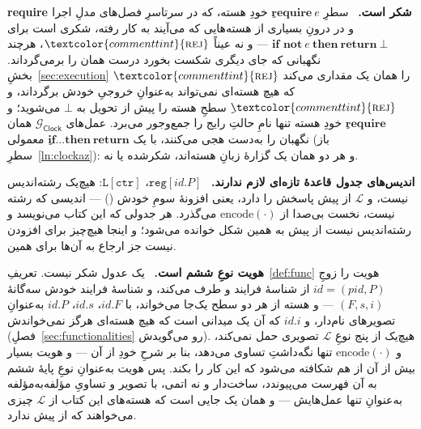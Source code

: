 \documentclass[10pt,oneside,openany]{book}
\newcommand{\PID}{\mathit{pid}}
\newcommand{\op}[1]{\textnormal{\textsc{#1}}}
\newcommand{\id}{id}
\newcommand{\atom}[1]{\textcolor{commenttint}{\op{#1}}}
\newcommand{\rej}{\atom{rej}}
\newcommand{\Gclock}{\mathcal{G}_{\mathsf{Clock}}}
\newcommand{\none}{\bot}
\newcommand{\V}[1]{\mathtt{#1}}
\newcommand{\heading}[1]{\medskip\par\noindent\textcolor{accent}{\textbf{#1.}}\ }
\theoremstyle{accentdef}
\theoremstyle{accentplain}
\begin{document}
\heading{require شکر است} سطرِ $\textbf{require}\ e$ِ خودِ هسته، که در
سرتاسرِ فصل‌های مدلِ اجرا و در درونِ بسیاری از هسته‌هایی که می‌آیند به کار
رفته، شکری است برای $\textbf{if not}\ e\ \textbf{then}\ \textbf{return}\
\none$ --- و نه عیناً $\rej$، هرچند نگهبانی که جای دیگری شکست بخورد درست
همان را برمی‌گرداند. بخشِ~\ref{sec:execution} $\rej$ را همان یک مقداری
می‌کند که هیچ هسته‌ای نمی‌تواند به‌عنوانِ خروجیِ خودش برگرداند، و $\rej$ِ
سطحِ هسته را پیش از تحویل به $\none$ می‌شوید؛ و $\textbf{require}$ِ خودِ
هسته تنها نامِ حالتِ رایج را جمع‌وجور می‌برد. عمل‌های $\Gclock$ همان نگهبان
را به‌دست هجی می‌کنند، با یک $\textbf{if}\dots\textbf{then}\
\textbf{return}$ِ معمولی (باز سطرِ~\ref{ln:clockaz}): و هر دو همان یک گزارهٔ
زبانِ هسته‌اند، شکرشده یا نه.

\heading{اندیس‌های جدول قاعدهٔ تازه‌ای لازم ندارند} $\V{reg}[\id.P]$،
$\V{L}[\V{ctr}]$: هیچ‌یک رشته‌اندیس نیست، و $\mathcal{L}$ از پیش پاسخش را
دارد، یعنی افزونهٔ سومِ خودش (\cite{BR06}) --- اندیسی که رشته نیست، نخست
بی‌صدا از $\mathrm{encode}(\cdot)$ می‌گذرد. هر جدولی که این کتاب می‌نویسد و
رشته‌اندیس نیست از پیش به همین شکل خوانده می‌شود؛ و اینجا هیچ‌چیز برای
افزودن نیست جز ارجاع به آن‌ها برای همین.

\heading{هویت نوعِ ششم است} یک عدول شکر نیست. تعریفِ~\ref{def:func} هویت را
زوجِ $\id = (\PID,P)$ از شناسهٔ فرایند و طرف می‌کند، و شناسهٔ فرایند خودش
سه‌گانهٔ $(F,s,i)$ --- و هسته از هر دو سطح یک‌جا می‌خواند، با $\id.F$،
$\id.s$، $\id.P$ به‌عنوانِ تصویرهای نام‌دار، و $\id.i$ که آن یک میدانی است
که هیچ هسته‌ای هرگز نمی‌خواندش (فصلِ~\ref{sec:functionalities} رو
می‌گویدش). هیچ‌یک از پنج نوعِ $\mathcal{L}$ تصویری حمل نمی‌کند، و
$\mathrm{encode}(\cdot)$ تنها نگه‌داشتِ تساوی می‌دهد، بنا بر شرحِ خودِ
\cite{BR06} از آن --- و هویت بسیار بیش از آن از هم شکافته می‌شود که این کار
را بکند. پس هویت به‌عنوانِ نوعِ پایهٔ ششم به آن فهرست می‌پیوندد، ساخت‌دار و
نه اتمی، با تصویر و تساویِ مؤلفه‌به‌مؤلفه به‌عنوانِ تنها عمل‌هایش --- و همان
یک جایی است که هسته‌های این کتاب از $\mathcal{L}$ چیزی می‌خواهند که از پیش
ندارد.
\end{document}
